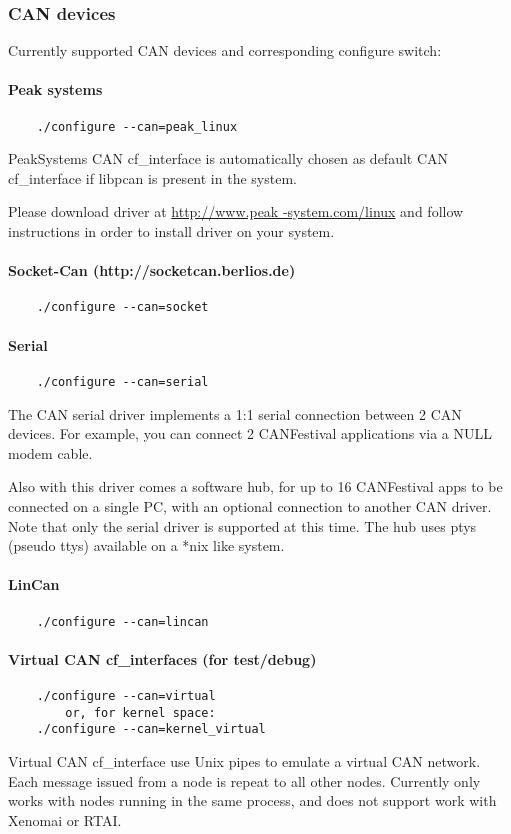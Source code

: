 \documentclass[12pt,english,a4paper]{book}
\begin{document}
\subsubsection{CAN devices}
Currently supported CAN devices and corresponding configure switch:

\paragraph{Peak systems}
\begin{verbatim}
	./configure --can=peak_linux
\end{verbatim}
PeakSystems CAN cf_interface is automatically chosen as default CAN cf_interface
if libpcan is present in the system.

Please download driver at \href{http://www.peak-system.com/linux}{http://www.peak
-system.com/linux} and follow instructions in order to install driver
on your system.

\paragraph{Socket-Can (http://socketcan.berlios.de)}
\begin{verbatim}
	./configure --can=socket
\end{verbatim}

\paragraph{Serial}
\begin{verbatim}
	./configure --can=serial
\end{verbatim}
The CAN serial driver implements a 1:1 serial connection between 2 CAN devices.
For example, you can connect 2 CANFestival applications via a NULL modem cable.

Also with this driver comes a software hub, for up to 16 CANFestival apps to 
be connected on a single PC, with an optional connection to another CAN driver.
Note that only the serial driver is supported at this time.  The hub uses ptys 
(pseudo ttys) available on a *nix like system.

\paragraph{LinCan}
\begin{verbatim}
	./configure --can=lincan
\end{verbatim}

\paragraph{Virtual CAN cf_interfaces (for test/debug)}
\begin{verbatim}
	./configure --can=virtual
		or, for kernel space:
	./configure --can=kernel_virtual
\end{verbatim}
Virtual CAN cf_interface use Unix pipes to emulate a virtual CAN network.
Each message issued from a node is repeat to all other nodes. Currently
only works with nodes running in the same process, and does not support
work with Xenomai or RTAI.
\end{document}
